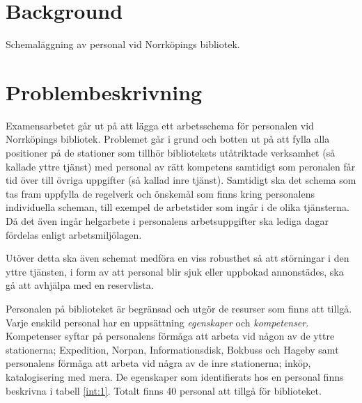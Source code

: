

\section{Background} 
Schemaläggning av personal vid Norrköpings bibliotek.

\section{Problembeskrivning}
Examensarbetet går ut på att lägga ett arbetsschema för personalen vid Norrköpings bibliotek. Problemet går i grund och botten ut på att fylla alla positioner på de stationer som tillhör bibliotekets utåtriktade verksamhet (så kallade yttre tjänst) med personal av rätt kompetens samtidigt som peronalen får tid över till övriga uppgifter (så kallad inre tjänst). Samtidigt ska det schema som tas fram uppfylla de regelverk och önskemål som finns kring personalens individuella scheman, till exempel de arbetstider som ingår i de olika tjänsterna. Då det även ingår helgarbete i personalens arbetsuppgifter ska lediga dagar fördelas enligt arbetsmiljölagen.

Utöver detta ska även schemat medföra en viss robusthet så att störningar i den yttre tjänsten, i form av att personal blir sjuk eller uppbokad annonstädes, ska gå att avhjälpa med en reservlista.

Personalen på biblioteket är begränsad och utgör de resurser som finns att tillgå. Varje enskild personal har en uppsättning \textit{egenskaper} och \textit{kompetenser}. Kompetenser syftar på personalens förmåga att arbeta vid någon av de yttre stationerna; Expedition, Norpan, Informationsdisk, Bokbuss och Hageby samt personalens förmåga att arbeta vid några av de inre stationerna; inköp, katalogisering med mera. De egenskaper som identifierats hos en personal finns beskrivna i tabell \ref{int:1}. Totalt finns 40 personal att tillgå för biblioteket.

